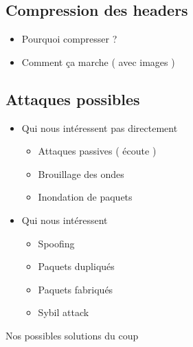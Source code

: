 	\subsection{Compression des headers}
		\begin{itemize}
			\item Pourquoi compresser ?
			\item Comment ça marche ( avec images )
		\end{itemize}
	
	
	\subsection{Attaques possibles}
	\begin{itemize}
		\item Qui nous intéressent pas directement
		\begin{itemize}
			\item Attaques passives ( écoute )
			\item Brouillage des ondes
			\item Inondation de paquets
		\end{itemize}
		\item Qui nous intéressent
		\begin{itemize}
			\item Spoofing
			\item Paquets dupliqués
			\item Paquets fabriqués
			\item Sybil attack
		\end{itemize}
	\end{itemize}
	Nos possibles solutions du coup


